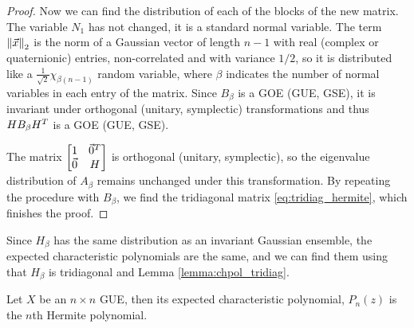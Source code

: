 \begin{proof}
    Now we can find the distribution of each of the blocks of the new matrix. The variable $N_1$ has not changed, it is a standard normal variable. The term $\left\lVert\vec x\right\rVert_2$ is the norm of a Gaussian vector of length $n-1$ with real (complex or quaternionic) entries, non-correlated and with variance $1/2$, so it is distributed like a $\frac1{\sqrt{2}}\chi_{\beta(n-1)}$ random variable, where $\beta$ indicates the number of normal variables in each entry of the matrix. Since $B_\beta$ is a GOE (GUE, GSE), it is invariant under orthogonal (unitary, symplectic) transformations and thus $H B_{\beta} H^T$ is a GOE (GUE, GSE).

    The matrix $ \begin{bmatrix}
        1 & \vec0^T \\ 
        \vec0 & H
    \end{bmatrix}$ is orthogonal (unitary, symplectic), so the eigenvalue distribution of $A_\beta$ remains unchanged under this transformation. By repeating the procedure with $B_\beta$, we find the tridiagonal matrix \eqref{eq:tridiag_hermite}, which finishes the proof.
\end{proof}


Since $H_\beta$ has the same distribution as an invariant Gaussian ensemble, the expected characteristic polynomials are the same, and we can find them using that $H_\beta$ is tridiagonal and Lemma \ref{lemma:chpol_tridiag}.



\begin{theorem} \label{thm:dyson_is_hermite}
    Let $X$ be an $n\times n$ GUE, then its expected characteristic polynomial, $P_n(z)$ is the $n$th Hermite polynomial.
\end{theorem}

